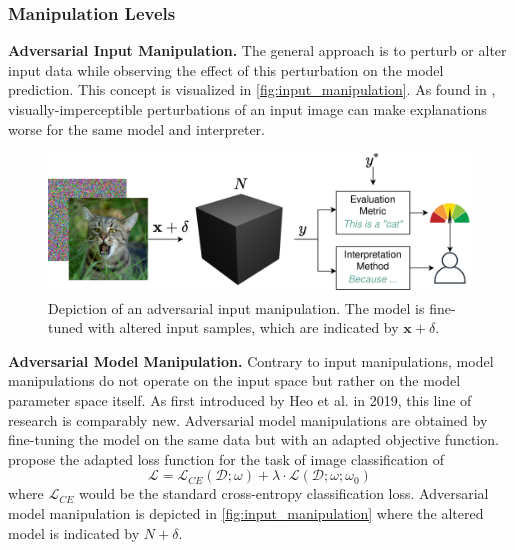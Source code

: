 \subsubsection{Manipulation Levels}
\label{subsubsec:manipulation_levels}
\par\smallskip
\noindent 

\par\smallskip
\noindent\textbf{Adversarial Input Manipulation.} The general approach is to perturb or alter input data while observing the effect of this perturbation on the model prediction. This concept is visualized in \autoref{fig:input_manipulation}. 
As found in \cite{dombrowski2019explanations}, visually-imperceptible perturbations of an input image can make explanations worse for the same model and interpreter. 

\begin{figure}[ht]
    \centering
    \includegraphics[width=\linewidth]{figures/input_manipulations.png}
    \caption{Depiction of an adversarial input manipulation. The model is fine-tuned with altered input samples, which are indicated by $\mathbf{x}+\delta$.}
    \label{fig:input_manipulation}
    \vspace{-0.3cm}
\end{figure}

\par\smallskip
\noindent\textbf{Adversarial Model Manipulation.} 
Contrary to input manipulations, model manipulations do not operate on the input space but rather on the model parameter space itself. 
As first introduced by Heo et al. \cite{fooling_nn_interpreters} in 2019, this line of research is comparably new. 
Adversarial model manipulations are obtained by fine-tuning the model on the same data but with an adapted objective function. \cite{fooling_nn_interpreters} propose the adapted loss function for the task of image classification of $$ \mathcal{L} = \mathcal{L}_{CE}(\mathcal{D};\omega) + \lambda \cdot \mathcal{L}(\mathcal{D};\omega; \omega_0) $$ where $\mathcal{L}_{CE}$ would be the standard cross-entropy classification loss. 
Adversarial model manipulation is depicted in \autoref{fig:input_manipulation} where the altered model is indicated by $N+\delta$.

